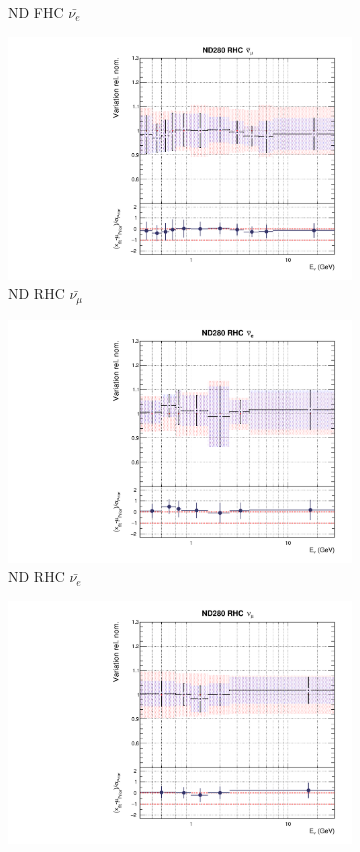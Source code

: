 \begin{figure}[t]
\begin{subfigure}{0.24\textwidth}
  \caption{ND FHC $\bar{\nu_{e}}$}
  \label{fig:}
\end{subfigure}
\begin{subfigure}{0.24\textwidth}
  \centering
  \includegraphics[width=0.95\linewidth]{figs/rhcmpdat248flux_4}
  \caption{ND RHC $\bar{\nu_{\mu}}$}
  \label{fig:}
\end{subfigure}
\begin{subfigure}{0.24\textwidth}
  \centering
  \includegraphics[width=0.95\linewidth]{figs/rhcmpdat248flux_5}
  \caption{ND RHC $\bar{\nu_{e}}$}
  \label{fig:}
\end{subfigure}
\begin{subfigure}{0.24\textwidth}
  \centering
  \includegraphics[width=0.95\linewidth]{figs/rhcmpdat248flux_6}

\end{subfigure}
\end{figure}

